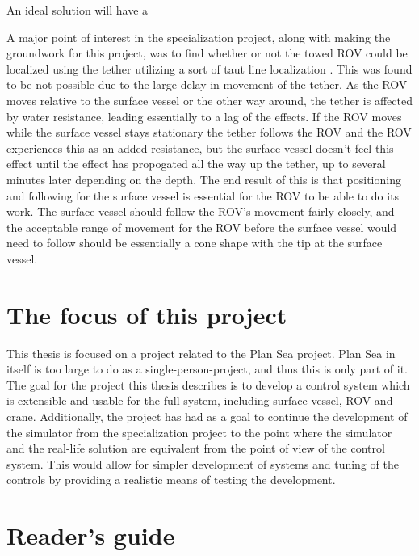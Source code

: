 \documentclass[class=article, crop=false]{standalone}
\begin{document}
An ideal solution will have a

A major point of interest in the specialization project, along with making the groundwork for this project, was to find whether or not the towed ROV could be localized using the tether utilizing a sort of taut line localization \cite{app:taut-line}. This was found to be not possible due to the large delay in movement of the tether. As the ROV moves relative to the surface vessel or the other way around, the tether is affected by water resistance, leading essentially to a lag of the effects. If the ROV moves while the surface vessel stays stationary the tether follows the ROV and the ROV experiences this as an added resistance, but the surface vessel doesn't feel this effect until the effect has propogated all the way up the tether, up to several minutes later depending on the depth. The end result of this is that positioning and following for the surface vessel is essential for the ROV to be able to do its work. The surface vessel should follow the ROV's movement fairly closely, and the acceptable range of movement for the ROV before the surface vessel would need to follow should be essentially a cone shape with the tip at the surface vessel.

\section{The focus of this project}
This thesis is focused on a project related to the Plan Sea project. Plan Sea in itself is too large to do as a single-person-project, and thus this is only part of it. The goal for the project this thesis describes is to develop a control system which is extensible and usable for the full system, including surface vessel, ROV and crane. Additionally, the project has had as a goal to continue the development of the simulator from the specialization project to the point where the simulator and the real-life solution are equivalent from the point of view of the control system. This would allow for simpler development of systems and tuning of the controls by providing a realistic means of testing the development.

\section{Reader's guide}

%
\end{document}
